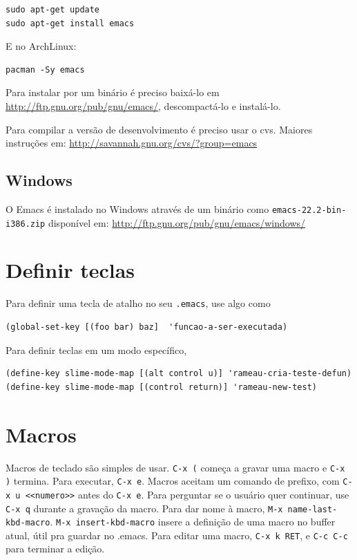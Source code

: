 \documentclass[12pt,brazil]{book}
\begin{document}
\begin{verbatim}
sudo apt-get update
sudo apt-get install emacs
\end{verbatim}

E no ArchLinux:

\begin{verbatim}
pacman -Sy emacs
\end{verbatim}

Para instalar por um binário é preciso baixá-lo em
\url{http://ftp.gnu.org/pub/gnu/emacs/}, descompactá-lo e instalá-lo.

Para compilar a versão de desenvolvimento é preciso usar o
cvs. Maiores instruções em:
\url{http://savannah.gnu.org/cvs/?group=emacs}

\subsection{Windows}
\label{sec:windows}

O Emacs é instalado no Windows através de um binário como
\texttt{emacs-22.2-bin-i386.zip} disponível em:
\url{http://ftp.gnu.org/pub/gnu/emacs/windows/}


\section{Definir teclas}
\label{sec:teclas}

Para definir uma tecla de atalho no seu \texttt{.emacs}, use algo como

\begin{verbatim}
(global-set-key [(foo bar) baz]  'funcao-a-ser-executada)
\end{verbatim}

Para definir teclas em um modo específico,

\begin{verbatim}
(define-key slime-mode-map [(alt control u)] 'rameau-cria-teste-defun)
(define-key slime-mode-map [(control return)] 'rameau-new-test)
\end{verbatim}

\section{Macros}
\label{sec:macros}

Macros de teclado são simples de usar. \texttt{C-x (} começa a gravar
uma macro e \texttt{C-x )} termina. Para executar, \texttt{C-x
  e}. Macros aceitam um comando de prefixo, com \texttt{C-x u
  <<numero>>} antes do \texttt{C-x e}. Para perguntar se o usuário
quer continuar, use \texttt{C-x q} durante a gravação da macro. Para
dar nome à macro, \texttt{M-x name-last-kbd-macro}. \texttt{M-x
  insert-kbd-macro} insere a definição de uma macro no buffer atual,
útil pra guardar no .emacs. Para editar uma macro, \texttt{C-x k RET},
e \texttt{C-c C-c} para terminar a edição.
\end{document}
